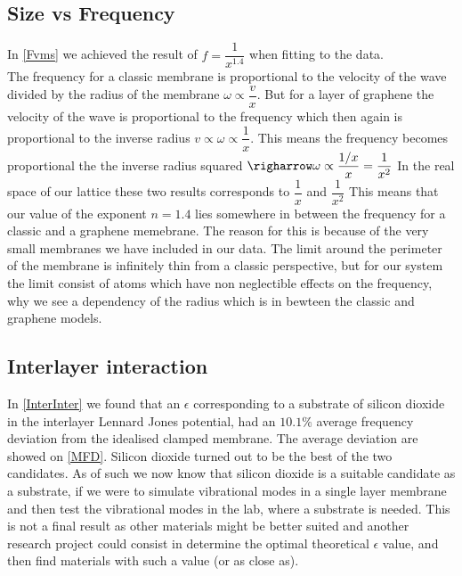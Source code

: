 \subsection{Size vs Frequency}
In \cref{Fvms} we achieved the result of $f=\dfrac{1}{x^{1.4}}$ when fitting to the data. \\
The frequency for a classic membrane is proportional to the velocity of the wave divided by the radius of the membrane $\omega \propto \dfrac{v}{x}$. But for a layer of graphene the velocity of the wave is proportional to the frequency which then again is proportional to the inverse radius $v\propto\omega\propto\dfrac{1}{x}$. This means the frequency becomes proportional the the inverse radius squared $\righarrow \omega \propto \dfrac{1/x}{x}=\dfrac{1}{x^{2}}$ In the real space of our lattice these two results corresponds to $\dfrac{1}{x}$ and $\dfrac{1}{x^{2}}$ This means that our value of the exponent $n=1.4$ lies somewhere in between the frequency for a classic and a graphene memebrane. The reason for this is because of the very small membranes we have included in our data. The limit around the perimeter of the membrane is infinitely thin from a classic perspective, but for our system the limit consist of atoms which have non neglectible effects on the frequency, why we see a dependency of the radius which is in bewteen the classic and graphene models. 
\subsection{Interlayer interaction}
In \cref{InterInter} we found that an $\epsilon$ corresponding to a substrate of silicon dioxide in the interlayer Lennard Jones potential, had an $10.1\%$ average frequency deviation from the idealised clamped membrane. The average deviation are showed on \cref{MFD}. Silicon dioxide turned out to be the best of the two candidates. As of such we now know that silicon dioxide is a suitable candidate as a substrate, if we were to simulate vibrational modes in a single layer membrane and then test the vibrational modes in the lab, where a substrate is needed. This is not a final result as other materials might be better suited and another research project could consist in determine the optimal theoretical $\epsilon$ value, and then find materials with such a value (or as close as).
